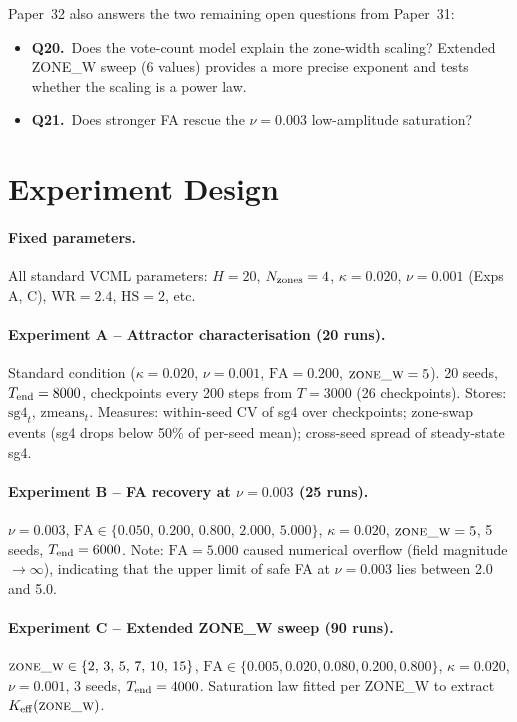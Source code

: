 \documentclass[11pt,a4paper]{article}
\begin{document}
Paper~32 also answers the two remaining open questions from Paper~31:
\begin{itemize}
  \item \textbf{Q20.}\ Does the vote-count model explain the zone-width scaling?
    Extended ZONE\_W sweep (6 values) provides a more precise exponent and tests
    whether the scaling is a power law.
  \item \textbf{Q21.}\ Does stronger FA rescue the $\nu=0.003$ low-amplitude
    saturation?
\end{itemize}

\section{Experiment Design}
\label{sec:design}

\paragraph{Fixed parameters.}
All standard VCML parameters: $H=20$, $N_{\rm zones}=4$, $\kappa=0.020$,
$\nu=0.001$ (Exps A, C), $\mathrm{WR}=2.4$, $\mathrm{HS}=2$, etc.

\paragraph{Experiment A -- Attractor characterisation (20 runs).}
Standard condition ($\kappa=0.020$, $\nu=0.001$, $\mathrm{FA}=0.200$, $\textsc{zone\_w}=5$).
20 seeds, $T_{\rm end}=8000$, checkpoints every 200 steps from $T=3000$ (26 checkpoints).
Stores: $\mathrm{sg4}_t$, $\mathrm{zmeans}_t$.
Measures: within-seed CV of sg4 over checkpoints; zone-swap events (sg4 drops below
50\% of per-seed mean); cross-seed spread of steady-state sg4.

\paragraph{Experiment B -- FA recovery at $\nu=0.003$ (25 runs).}
$\nu=0.003$, $\mathrm{FA} \in \{0.050,\,0.200,\,0.800,\,2.000,\,5.000\}$,
$\kappa=0.020$, $\textsc{zone\_w}=5$, 5 seeds, $T_{\rm end}=6000$.
Note: $\mathrm{FA}=5.000$ caused numerical overflow (field magnitude $\to\infty$),
indicating that the upper limit of safe FA at $\nu=0.003$ lies between 2.0 and 5.0.

\paragraph{Experiment C -- Extended ZONE\_W sweep (90 runs).}
$\textsc{zone\_w} \in \{2,\,3,\,5,\,7,\,10,\,15\}$, $\mathrm{FA} \in \{0.005, 0.020,
0.080, 0.200, 0.800\}$, $\kappa=0.020$, $\nu=0.001$, 3 seeds, $T_{\rm end}=4000$.
Saturation law fitted per ZONE\_W to extract $K_{\rm eff}(\textsc{zone\_w})$.
\end{document}
